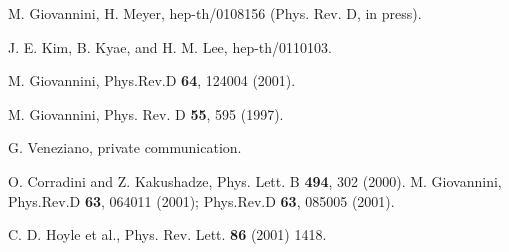 \documentclass[a4paper,12pt]{article}
\begin{document}
\begin{thebibliography}{99}
 M. Giovannini, H. Meyer, hep-th/0108156 (Phys. Rev. D, in press).

 J. E. Kim,  B. Kyae, and H. M. Lee, hep-th/0110103. 

 M. Giovannini, Phys.Rev.D {\bf 64}, 124004 (2001). 

 M. Giovannini,  Phys. Rev. D {\bf 55}, 595 (1997).

 G. Veneziano, private communication.

 O. Corradini and Z. Kakushadze, Phys. Lett. B {\bf 494}, 302
 (2000).
 M. Giovannini,  Phys.Rev.D {\bf 63}, 064011 (2001); 
Phys.Rev.D {\bf 63}, 085005 (2001).  

 C. D. Hoyle et al., Phys. Rev. Lett. {\bf 86} (2001) 1418.

\end{thebibliography}
\end{document}
